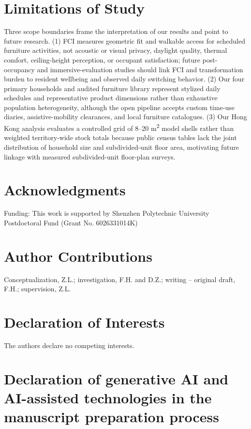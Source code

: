 \documentclass[12pt,letterpaper]{article}
\begin{document}
\section{Limitations of Study}\label{limitations-of-study}

Three scope boundaries frame the interpretation of our results and point to future research. (1) FCI measures geometric fit and walkable access for scheduled furniture activities, not acoustic or visual privacy, daylight quality, thermal comfort, ceiling-height perception, or occupant satisfaction; future post-occupancy and immersive-evaluation studies should link FCI and transformation burden to resident wellbeing and observed daily switching behavior. (2) Our four primary households and audited furniture library represent stylized daily schedules and representative product dimensions rather than exhaustive population heterogeneity, although the open pipeline accepts custom time-use diaries, assistive-mobility clearances, and local furniture catalogues. (3) Our Hong Kong analysis evaluates a controlled grid of 8--20 m\textsuperscript{2} model shells rather than weighted territory-wide stock totals because public census tables lack the joint distribution of household size and subdivided-unit floor area, motivating future linkage with measured subdivided-unit floor-plan surveys.

\section{Acknowledgments}\label{acknowledgments}

Funding: This work is supported by Shenzhen Polytechnic University Postdoctoral Fund (Grant No. 6026331014K)

\section{Author Contributions}\label{author-contributions}

Conceptualization, Z.L.; investigation, F.H. and D.Z.; writing -- original draft, F.H.; supervision, Z.L.

\section{Declaration of Interests}\label{declaration-of-interests}

The authors declare no competing interests.

\section{Declaration of generative AI and AI-assisted technologies in the manuscript preparation process}\label{declaration-of-generative-ai-and-ai-assisted-technologies-in-the-manuscript-preparation-process}
\end{document}
